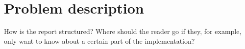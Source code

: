 \section{Problem description}
How is the report structured? Where should the reader go if they, for example, only want to know about a certain part of the implementation?